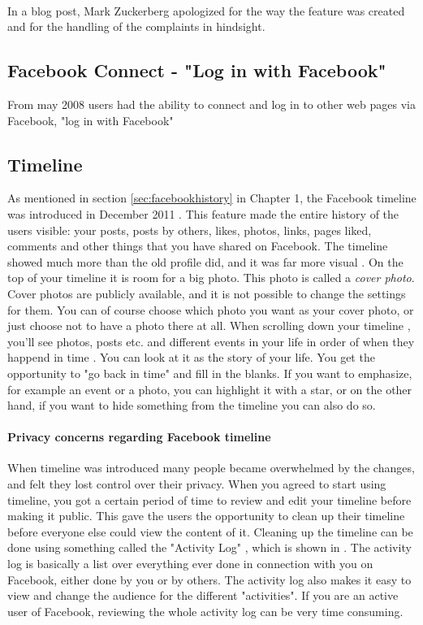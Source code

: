 \paragraph{}
In a blog post, Mark Zuckerberg apologized for the way the feature was created and for the handling of the complaints in hindsight. 
\cite{Beacon} 

\subsection{Facebook Connect - "Log in with Facebook"}
From may 2008 users had the ability to connect and log in to other web pages via Facebook, "log in with Facebook" 


\subsection{Timeline}
As mentioned in section \ref{sec:facebookhistory} in Chapter 1, the Facebook timeline was introduced in December 2011 \cite{EvolutionOfFacebook}. This feature made the entire history of the users visible: your posts, posts by others, likes, photos, links, pages liked, comments and other things that you have shared on Facebook. The timeline showed much more than the old profile did, and it was far more visual \cite{timeline}. On the top of your timeline it is room for a big photo. This photo is called a \emph{cover photo}. Cover photos are publicly available, and it is not possible to change the settings for them. You can of course choose which photo you want as your cover photo, or just choose not to have a photo there at all. When scrolling down your timeline , you'll see photos, posts etc. and different events in your life in order of when they happend in time \cite{timeline}. You can look at it as the story of your life. You get the opportunity to "go back in time" and fill in the blanks. If you want to emphasize, for example an event or a photo, you can highlight it with a star, or on the other hand, if you want to hide something from the timeline you can also do so. 

\paragraph{Privacy concerns regarding Facebook timeline}
When timeline was introduced many people became overwhelmed by the changes, and felt they lost control over their privacy. When you agreed to start using timeline, you got a certain period of time to review and edit your timeline before making it public. This gave the users the opportunity to clean up their timeline before everyone else could view the content of it. Cleaning up the timeline can be done using something called the "Activity Log" \cite{activitylog}, which is shown in . The activity log is basically a list over everything ever done in connection with you on Facebook, either done by you or by others. The activity log also makes it easy to view and change the audience for the different "activities". If you are an active user of Facebook, reviewing the whole activity log can be very time consuming. 


